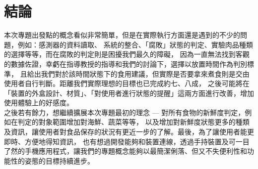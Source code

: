 \chapter{結論}

本次專題出發點的概念看似非常簡單，但是在實際執行方面還是遇到的不少的問題，例如：感測器的資料讀取、
系統的整合、「腐敗」狀態的判定、實驗肉品種類的選擇等等，而在腐敗的判定則是困擾我們最久的障礙，
因為一直無法找到客觀的數據佐證，幸虧在指導教授的指導和我們的討論下，選擇以放置時間作為判別標準，
且給出我們對於該時間狀態下的食用建議，但實際是否要拿來煮食則是交由使用者自行判斷。距離我們實際理想的目標也已完成約七、八成，
之後可能將在「裝置的外盒設計、材質」、「對使用者進行狀態的提醒」這兩方面進行改善，增加使用體驗上的好感度。\\

之後若有餘力，想繼續擴展本次專題最初的理念 — 對所有食物的新鮮度判定，例如在判定的對象範圍增加對海鮮、蔬菜等等，
以及增加對新鮮度狀態更多的種類及資訊，讓使用者對食品保存的狀況有更近一步的了解。最後，為了讓使用者能更即時、方便地得知資訊，
也有想過開發能夠和裝置連線，透過手持裝置及可一目了然的手機應用程式，讓我們的專題概念能夠以最簡潔俐落、但又不失便利性和功能性的姿態的目標持續進步。